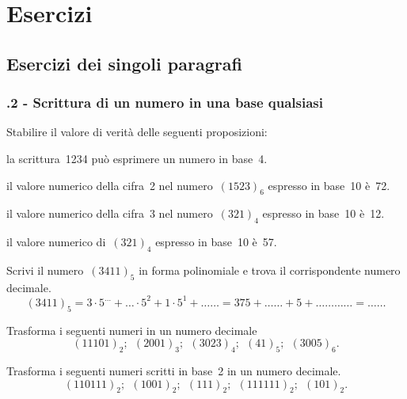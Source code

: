 \section{Esercizi}
\subsection{Esercizi dei singoli paragrafi}
\subsubsection*{\thechapter.2 - Scrittura di un numero in una base qualsiasi}

\begin{esercizio}
\label{ese:4.1}
Stabilire il valore di verità delle seguenti proposizioni:
\begin{enumeratea}
\TabPositions{12cm}
\item la scrittura~1234 può esprimere un numero in base~4. \tab\boxV\quad\boxF
\item il valore numerico della cifra~2 nel numero~$(1523)_{6}$ espresso in base~10 è~72.\tab\boxV\quad\boxF
\item il valore numerico della cifra~3 nel numero~$(321)_{4}$ espresso in base~10 è~12. \tab\boxV\quad\boxF
\item il valore numerico di~$(321)_{4}$ espresso in base~10 è~57. \tab\boxV\quad\boxF
\end{enumeratea}
\end{esercizio}

\begin{esercizio}
\label{ese:4.2}
Scrivi il numero~$(3411)_{5}$ in forma polinomiale e trova il corrispondente numero decimale.
\[
(3411)_{5}=3\cdot 5^{\ldots }+\ldots \cdot 5^{2}+1\cdot5^{1}+\ldots\ldots =375+\ldots\ldots +5+\ldots%
\ldots\ldots\ldots =\ldots\ldots\]
\end{esercizio}

\begin{esercizio}[\Ast]
\label{ese:4.3}
Trasforma i seguenti numeri in un numero
decimale
\[(11101)_{2};\:\:(2001)_{3};\:\:(3023)_{4};\:\:(41)_{5};\:\:(3005)_{6}.\]
\end{esercizio}

\begin{esercizio}[\Ast]
\label{ese:4.4}
Trasforma i seguenti numeri scritti in base~2 in un numero decimale.
\[(110111)_{2};\:\:(1001)_{2};\:\:(111)_{2};\:\:(111111)_{2};\:\:(101)_{2}.\]
\end{esercizio}

